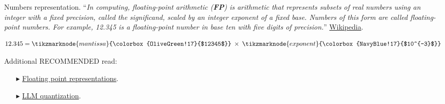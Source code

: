 \documentclass[aspectratio=169]{beamer}
\newcommand{\highlight}[2]{\colorbox{#1!17}{$#2$}}
\begin{document}
\begin{frame}{Numbers representation.}
    ``{\it In computing, \alert{floating-point arithmetic (\textbf{FP})} is arithmetic that represents subsets of real numbers using an integer with a fixed precision, called the significand, scaled by an integer exponent of a fixed base. Numbers of this form are called floating-point numbers. For example, 12.345 is a floating-point number in base ten with five digits of precision.}'' \href{https://en.wikipedia.org/wiki/Floating-point_arithmetic}{Wikipedia}.

    \begin{equation*}
        12.345 = \tikzmarknode{mantissa}{\highlight{OliveGreen}{12345}} \: \times \:
        \tikzmarknode{exponent}{\highlight{NavyBlue}{10^{-3}}}
    \end{equation*}


    Additional RECOMMENDED read:
    \begin{itemize}
        \item[$\blacktriangleright$]
        \href{https://en.wikibooks.org/wiki/A-level_Computing/AQA/Paper_2/Fundamentals_of_data_representation/Floating_point_numbers}{Floating point representations}.

        \item[$\blacktriangleright$]
        \href{https://medium.com/@lmpo/understanding-model-quantization-for-llms-1573490d44ad}{LLM quantization}.
    \end{itemize}
\end{frame}
\end{document}
